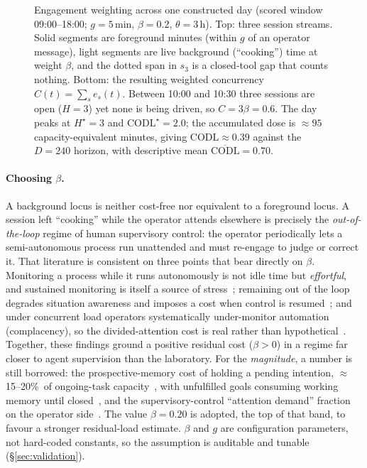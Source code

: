 \documentclass[10pt,twocolumn]{article}
\begin{document}
\begin{figure}[t]
{%
}
\caption{Engagement weighting across one constructed day (scored window
09:00--18:00; $g=5$\,min, $\beta=0.2$, $\theta=3$\,h). Top: three session
streams. Solid segments are foreground minutes (within $g$ of an operator
message), light segments are live background (``cooking'') time at weight
$\beta$, and the dotted span in $s_3$ is a closed-tool gap that counts nothing.
Bottom: the resulting weighted concurrency $C(t)=\sum_s e_s(t)$. Between 10:00
and 10:30 three sessions are open ($H{=}3$) yet none is being driven, so
$C=3\beta=0.6$. The day peaks at $H^{\star}{=}3$ and
$\mathrm{CODL}^{\star}{=}2.0$; the accumulated dose is $\approx 95$
capacity-equivalent minutes, giving $\mathrm{CODL}\approx 0.39$ against the
$D=240$ horizon, with descriptive mean $\overline{\mathrm{CODL}}=0.70$.}
\label{fig:engagement}
\end{figure}

\paragraph{Choosing $\beta$.} A background locus is neither cost-free nor
equivalent to a foreground locus.
A session left ``cooking'' while the operator attends elsewhere is precisely the
\emph{out-of-the-loop} regime of human supervisory control: the operator
periodically lets a semi-autonomous process run unattended and must re-engage to
judge or correct it. That literature is consistent on three points that bear
directly on $\beta$. Monitoring a process while it runs autonomously is not idle time but
\emph{effortful}, and sustained monitoring is itself a source of
stress~\cite{warm2008}; remaining out of the loop degrades situation awareness
and imposes a cost when control is resumed~\cite{endsley1995,eriksson2017}; and
under concurrent load operators systematically under-monitor automation
(complacency), so the divided-attention cost is real rather than
hypothetical~\cite{parasuraman2010}. Together, these findings ground a positive residual
cost ($\beta>0$) in a regime far closer to agent supervision than the laboratory. For the
\emph{magnitude}, a number is still borrowed: the prospective-memory cost of holding
a pending intention, $\approx$15--20\%\ of ongoing-task capacity~\cite{smith2003},
with unfulfilled goals consuming working memory until closed~\cite{masicampo2011},
and the supervisory-control ``attention demand'' fraction on the operator
side~\cite{crandall2007}. The value $\beta=0.20$ is adopted, the top of that band,
to favour a stronger residual-load estimate. $\beta$ and $g$ are
configuration parameters, not hard-coded constants, so the assumption is auditable
and tunable (\S\ref{sec:validation}).
\end{document}
